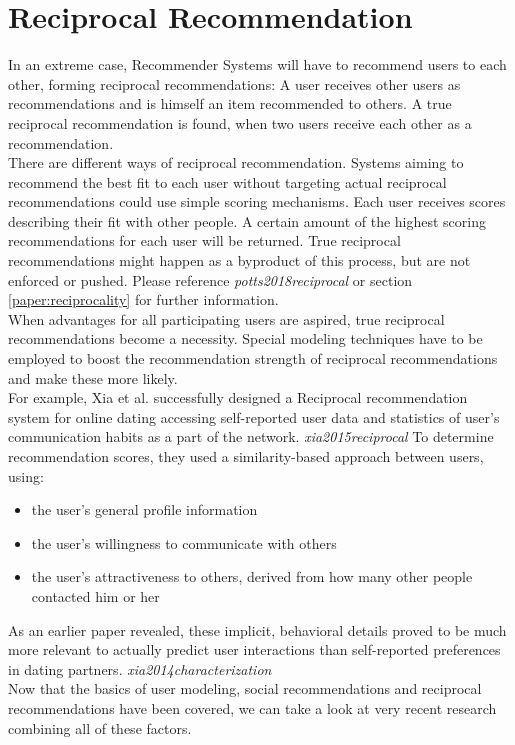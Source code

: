 \documentclass[nochapterpage,bigchapter,linedtoc,longdoc,colorback,accentcolor=tud3b,oneside]{tudreport}
\begin{document}
\section{Reciprocal Recommendation}\label{rw:reciprocalrec}
In an extreme case, Recommender Systems will have to recommend users to each other, forming reciprocal recommendations: A user receives other users as recommendations and is himself an item recommended to others. A true reciprocal recommendation is found, when two users receive each other as a recommendation.\\
There are different ways of reciprocal recommendation. Systems aiming to recommend the best fit to each user without targeting actual reciprocal recommendations could use simple scoring mechanisms. Each user receives scores describing their fit with other people. A certain amount of the highest scoring recommendations for each user will be returned. True reciprocal recommendations might happen as a byproduct of this process, but are not enforced or pushed. Please reference \textit{potts2018reciprocal} or section \ref{paper:reciprocality} for further information.\\
When advantages for all participating users are aspired, true reciprocal recommendations become a necessity. Special modeling techniques have to be employed to boost the recommendation strength of reciprocal recommendations and make these more likely.\\
For example, Xia et al. successfully designed a Reciprocal recommendation system for online dating accessing self-reported user data and statistics of user's communication habits as a part of the network. \textit{xia2015reciprocal} To determine recommendation scores, they used a similarity-based approach between users, using:\\
\begin{itemize}
	\item the user's general profile information
	\item the user's willingness to communicate with others
	\item the user's attractiveness to others, derived from how many other people contacted him or her
\end{itemize}
As an earlier paper revealed, these implicit, behavioral details proved to be much more relevant to actually predict user interactions than self-reported preferences in dating partners. \textit{xia2014characterization}\\

Now that the basics of user modeling, social recommendations and reciprocal recommendations have been covered, we can take a look at very recent research combining all of these factors.\\
\end{document}
